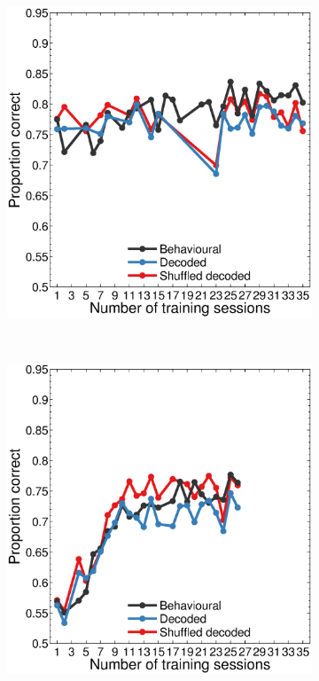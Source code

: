 \begin{figure}[htbp]
    \begin{subfigure}[b]{0.5\linewidth}
        \centering
        \caption{}
        \label{fig:dec_b4_allp}
	\includegraphics[width=\linewidth]{./figures/ncl_decoding/perf_v4_blanco.eps}
    \end{subfigure}
    ~~
    \begin{subfigure}[b]{0.5\linewidth}
        \centering
        \caption{}
        \label{fig:dec_j4_allp}
	\includegraphics[width=\linewidth]{./figures/ncl_decoding/perf_v4_jack.eps}

\end{subfigure}
\end{figure}

